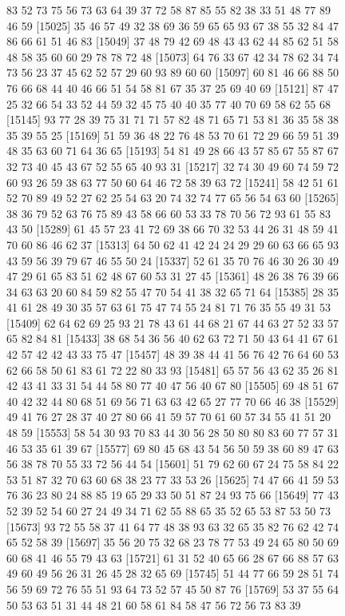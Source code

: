 \documentclass{article}
\begin{document}
\begin{figure}[H]
\begin{Schunk}
\begin{Soutput}
[15001] 83 52 73 75 56 73 63 64 39 37 72 58 87 85 55 82 38 33 51 48 77 89 46 59
[15025] 35 46 57 49 32 38 69 36 59 65 65 93 67 38 55 32 84 47 86 66 61 51 46 83
[15049] 37 48 79 42 69 48 43 43 62 44 85 62 51 58 48 58 35 60 60 29 78 78 72 48
[15073] 64 76 33 67 42 34 78 62 34 74 73 56 23 37 45 62 52 57 29 60 93 89 60 60
[15097] 60 81 46 66 88 50 76 66 68 44 40 46 66 51 54 58 81 67 35 37 25 69 40 69
[15121] 87 47 25 32 66 54 33 52 44 59 32 45 75 40 40 35 77 40 70 69 58 62 55 68
[15145] 93 77 28 39 75 31 71 71 57 82 48 71 65 71 53 81 36 35 58 38 35 39 55 25
[15169] 51 59 36 48 22 76 48 53 70 61 72 29 66 59 51 39 48 35 63 60 71 64 36 65
[15193] 54 81 49 28 66 43 57 85 67 55 87 67 32 73 40 45 43 67 52 55 65 40 93 31
[15217] 32 74 30 49 60 74 59 72 60 93 26 59 38 63 77 50 60 64 46 72 58 39 63 72
[15241] 58 42 51 61 52 70 89 49 52 27 62 25 54 63 20 74 32 74 77 65 56 54 63 60
[15265] 38 36 79 52 63 76 75 89 43 58 66 60 53 33 78 70 56 72 93 61 55 83 43 50
[15289] 61 45 57 23 41 72 69 38 66 70 32 53 44 26 31 48 59 41 70 60 86 46 62 37
[15313] 64 50 62 41 42 24 24 29 29 60 63 66 65 93 43 59 56 39 79 67 46 55 50 24
[15337] 52 61 35 70 76 46 30 26 30 49 47 29 61 65 83 51 62 48 67 60 53 31 27 45
[15361] 48 26 38 76 39 66 34 63 63 20 60 84 59 82 55 47 70 54 41 38 32 65 71 64
[15385] 28 35 41 61 28 49 30 35 57 63 61 75 47 74 55 24 81 71 76 35 55 49 31 53
[15409] 62 64 62 69 25 93 21 78 43 61 44 68 21 67 44 63 27 52 33 57 65 82 84 81
[15433] 38 68 54 36 56 40 62 63 72 71 50 43 64 41 67 61 42 57 42 42 43 33 75 47
[15457] 48 39 38 44 41 56 76 42 76 64 60 53 62 66 58 50 61 83 61 72 22 80 33 93
[15481] 65 57 56 43 62 35 26 81 42 43 41 33 31 54 44 58 80 77 40 47 56 40 67 80
[15505] 69 48 51 67 40 42 32 44 80 68 51 69 56 71 63 63 42 65 27 77 70 66 46 38
[15529] 49 41 76 27 28 37 40 27 80 66 41 59 57 70 61 60 57 34 55 41 51 20 48 59
[15553] 58 54 30 93 70 83 44 30 56 28 50 80 80 83 60 77 57 31 46 53 35 61 39 67
[15577] 69 80 45 68 43 54 56 50 59 38 60 89 47 63 56 38 78 70 55 33 72 56 44 54
[15601] 51 79 62 60 67 24 75 58 84 22 53 51 87 32 70 63 60 68 38 23 77 33 53 26
[15625] 74 47 66 41 59 53 76 36 23 80 24 88 85 19 65 29 33 50 51 87 24 93 75 66
[15649] 77 43 52 39 52 54 60 27 24 49 34 71 62 55 88 65 35 52 65 53 87 53 50 73
[15673] 93 72 55 58 37 41 64 77 48 38 93 63 32 65 35 82 76 62 42 74 65 52 58 39
[15697] 35 56 20 75 32 68 23 78 77 53 49 24 65 80 50 69 60 68 41 46 55 79 43 63
[15721] 61 31 52 40 65 66 28 67 66 88 57 63 49 60 49 56 26 31 26 45 28 32 65 69
[15745] 51 44 77 66 59 28 51 74 56 59 69 72 76 55 51 93 64 73 52 57 45 50 87 76
[15769] 53 37 55 64 50 53 63 51 31 44 48 21 60 58 61 84 58 47 56 72 56 73 83 39

\end{Soutput}
\end{Schunk}
\end{figure}
\end{document}
